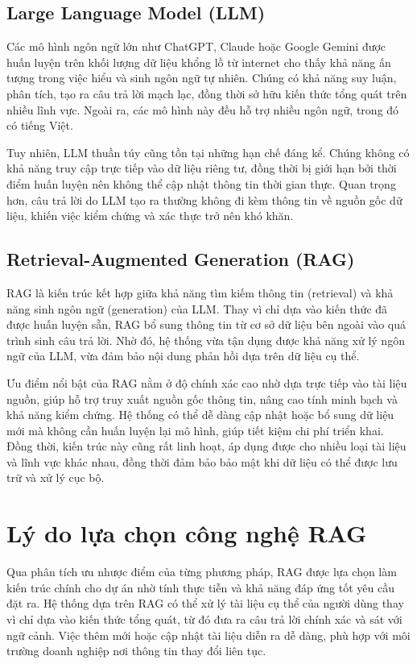 \subsection{Large Language Model (LLM)}

Các mô hình ngôn ngữ lớn như ChatGPT, Claude hoặc Google Gemini được huấn luyện trên khối lượng dữ liệu khổng lồ từ internet cho thấy khả năng ấn tượng trong việc hiểu và sinh ngôn ngữ tự nhiên. Chúng có khả năng suy luận, phân tích, tạo ra câu trả lời mạch lạc, đồng thời sở hữu kiến thức tổng quát trên nhiều lĩnh vực. Ngoài ra, các mô hình này đều hỗ trợ nhiều ngôn ngữ, trong đó có tiếng Việt.

Tuy nhiên, LLM thuần túy cũng tồn tại những hạn chế đáng kể. Chúng không có khả năng truy cập trực tiếp vào dữ liệu riêng tư, đồng thời bị giới hạn bởi thời điểm huấn luyện nên không thể cập nhật thông tin thời gian thực. Quan trọng hơn, câu trả lời do LLM tạo ra thường không đi kèm thông tin về nguồn gốc dữ liệu, khiến việc kiểm chứng và xác thực trở nên khó khăn.

\subsection{Retrieval-Augmented Generation (RAG)}

RAG là kiến trúc kết hợp giữa khả năng tìm kiếm thông tin (retrieval) và khả năng sinh ngôn ngữ (generation) của LLM. Thay vì chỉ dựa vào kiến thức đã được huấn luyện sẵn, RAG bổ sung thông tin từ cơ sở dữ liệu bên ngoài vào quá trình sinh câu trả lời. Nhờ đó, hệ thống vừa tận dụng được khả năng xử lý ngôn ngữ của LLM, vừa đảm bảo nội dung phản hồi dựa trên dữ liệu cụ thể.

Ưu điểm nổi bật của RAG nằm ở độ chính xác cao nhờ dựa trực tiếp vào tài liệu nguồn, giúp hỗ trợ truy xuất nguồn gốc thông tin, nâng cao tính minh bạch và khả năng kiểm chứng. Hệ thống có thể dễ dàng cập nhật hoặc bổ sung dữ liệu mới mà không cần huấn luyện lại mô hình, giúp tiết kiệm chi phí triển khai. Đồng thời, kiến trúc này cũng rất linh hoạt, áp dụng được cho nhiều loại tài liệu và lĩnh vực khác nhau, đồng thời đảm bảo bảo mật khi dữ liệu có thể được lưu trữ và xử lý cục bộ.

\section{Lý do lựa chọn công nghệ RAG}

Qua phân tích ưu nhược điểm của từng phương pháp, RAG được lựa chọn làm kiến trúc chính cho dự án nhờ tính thực tiễn và khả năng đáp ứng tốt yêu cầu đặt ra. Hệ thống dựa trên RAG có thể xử lý tài liệu cụ thể của người dùng thay vì chỉ dựa vào kiến thức tổng quát, từ đó đưa ra câu trả lời chính xác và sát với ngữ cảnh. Việc thêm mới hoặc cập nhật tài liệu diễn ra dễ dàng, phù hợp với môi trường doanh nghiệp nơi thông tin thay đổi liên tục.

